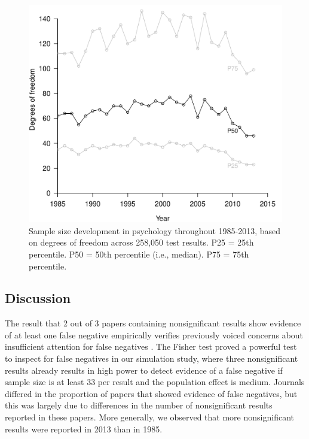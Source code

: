 \documentclass{article}
\begin{document}
\begin{figure}
\begin{center}
\includegraphics{../figures/Fig5.pdf}
\end{center}
\caption{Sample size development in psychology throughout 1985-2013, based on degrees of freedom across 258,050 test results. P25 = 25th percentile. P50 = 50th percentile (i.e., median). P75 = 75th percentile.}
\label{fig:fig5}
\end{figure}

\subsection*{Discussion}

The result that 2 out of 3 papers containing nonsignificant results show evidence of at least one false negative empirically verifies previously voiced concerns about insufficient attention for false negatives \cite{Fiedler2012-gx}. The Fisher test proved a powerful test to inspect for false negatives in our simulation study, where three nonsignificant results already results in high power to detect evidence of a false negative if sample size is at least 33 per result and the population effect is medium. Journals differed in the proportion of papers that showed evidence of false negatives, but this was largely due to differences in the number of nonsignificant results reported in these papers. More generally, we observed that more nonsignificant results were reported in 2013 than in 1985. 
\end{document}

